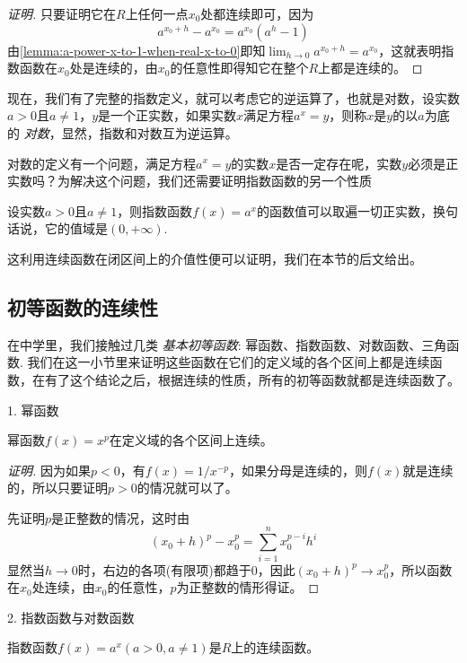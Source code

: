 \begin{proof}[证明]
  只要证明它在$R$上任何一点$x_0$处都连续即可，因为
  \[ a^{x_0+h} - a^{x_0} = a^{x_0}(a^h-1) \]
  由\autoref{lemma:a-power-x-to-1-when-real-x-to-0}即知$\lim_{h \to 0} a^{x_0+h} = a^{x_0}$，这就表明指数函数在$x_0$处是连续的，由$x_0$的任意性即得知它在整个$R$上都是连续的。
\end{proof}

现在，我们有了完整的指数定义，就可以考虑它的逆运算了，也就是对数，设实数$a>0$且$a \neq 1$，$y$是一个正实数，如果实数$x$满足方程$a^x=y$，则称$x$是$y$的以$a$为底的 \emph{对数}，显然，指数和对数互为逆运算。

对数的定义有一个问题，满足方程$a^x=y$的实数$x$是否一定存在呢，实数$y$必须是正实数吗？为解决这个问题，我们还需要证明指数函数的另一个性质
\begin{theorem}
  设实数$a>0$且$a \neq 1$，则指数函数$f(x)=a^x$的函数值可以取遍一切正实数，换句话说，它的值域是$(0,+\infty)$.
\end{theorem}

这利用连续函数在闭区间上的介值性便可以证明，我们在本节的后文给出。

\subsection{初等函数的连续性}
\label{sec:the-continuity-of-elementary-function}

在中学里，我们接触过几类 \emph{基本初等函数}: 幂函数、指数函数、对数函数、三角函数. 我们在这一小节里来证明这些函数在它们的定义域的各个区间上都是连续函数，在有了这个结论之后，根据连续的性质，所有的初等函数就都是连续函数了。

1. 幂函数
\begin{theorem}
  幂函数$f(x)=x^p$在定义域的各个区间上连续。
\end{theorem}

\begin{proof}[证明]
  因为如果$p<0$，有$f(x)=1/x^{-p}$，如果分母是连续的，则$f(x)$就是连续的，所以只要证明$p>0$的情况就可以了。

  先证明$p$是正整数的情况，这时由
  \[ (x_0+h)^p-x_0^p = \sum_{i=1}^nx_0^{p-i}h^i \]
  显然当$h \to 0$时，右边的各项(有限项)都趋于0，因此$(x_0+h)^p \to x_0^p$，所以函数在$x_0$处连续，由$x_0$的任意性，$p$为正整数的情形得证。
\end{proof}

2. 指数函数与对数函数
\begin{theorem}
  指数函数$f(x)=a^x(a>0,a\neq 1)$是$R$上的连续函数。
\end{theorem}

